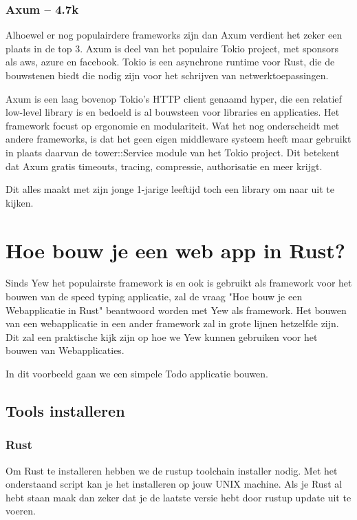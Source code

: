 \clearpage

\subsubsection{Axum – 4.7k}

Alhoewel er nog populairdere frameworks zijn dan Axum verdient het zeker een plaats in de top 3.
Axum is deel van het populaire Tokio project, met sponsors als aws, azure en facebook. Tokio is een
asynchrone runtime voor Rust, die de bouwstenen biedt die nodig zijn voor het schrijven van
netwerktoepassingen. 

Axum is een laag bovenop Tokio’s HTTP client genaamd hyper, die een relatief low-level library is en
bedoeld is al bouwsteen voor libraries en applicaties. Het framework focust op ergonomie en
modulariteit. Wat het nog onderscheidt met andere frameworks, is dat het geen eigen middleware
systeem heeft maar gebruikt in plaats daarvan de tower::Service module van het Tokio project. Dit
betekent dat Axum gratis timeouts, tracing, compressie, authorisatie en meer krijgt. 

Dit alles maakt met zijn jonge 1-jarige leeftijd toch een library om naar uit te kijken. 

\section{Hoe bouw je een web app in Rust?}

Sinds Yew het populairste framework is en ook is gebruikt als framework voor het bouwen van de speed
typing applicatie, zal de vraag "Hoe bouw je een Webapplicatie in Rust" beantwoord worden met Yew
als framework. Het bouwen van een webapplicatie in een ander framework zal in grote lijnen hetzelfde
zijn. Dit zal een praktische kijk zijn op hoe we Yew kunnen gebruiken voor het bouwen van
Webapplicaties.  

In dit voorbeeld gaan we een simpele Todo applicatie bouwen.

\subsection{Tools installeren}

\subsubsection{Rust}
Om Rust te installeren hebben we de rustup toolchain installer nodig. Met het onderstaand script kan
je het installeren op jouw UNIX machine. Als je Rust al hebt staan maak dan zeker dat je de laatste
versie hebt door rustup update uit te voeren.

